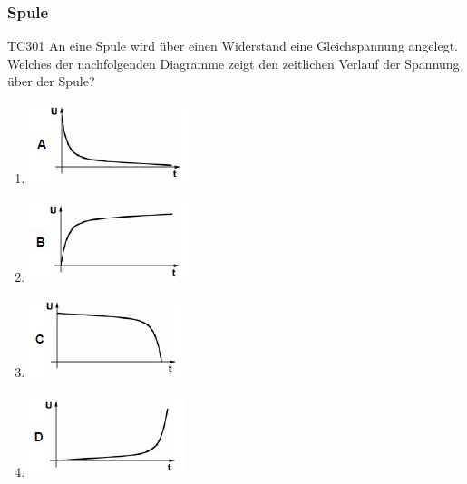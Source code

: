 \documentclass[8pt]{article}
\begin{document}
\begin{enumerate}
\begin{enumerate}[nolistsep,label=\Alph*]
{\subsubsection{Spule}
TC301 An eine Spule wird über einen Widerstand eine Gleichspannung angelegt. Welches der nachfolgenden Diagramme zeigt den zeitlichen Verlauf der Spannung über der Spule?
\begin{enumerate}[nolistsep,label=\Alph*]
\item 
	\begin{center}
		\begin{minipage}{\linewidth}
			\centering
			\includegraphics[scale=1.0]{pics/tc301_a.jpg}
		\end{minipage}
	\end{center}
\item
	\begin{center}
		\begin{minipage}{\linewidth}
			\centering
			\includegraphics[scale=1.0]{pics/tc301_b.jpg}
		\end{minipage}
	\end{center}
\item
	\begin{center}
		\begin{minipage}{\linewidth}
			\centering
			\includegraphics[scale=1.0]{pics/tc301_c.jpg}
		\end{minipage}
	\end{center}
\item
	\begin{center}
		\begin{minipage}{\linewidth}
			\centering
			\includegraphics[scale=1.0]{pics/tc301_d.jpg}
		\end{minipage}
	\end{center}
\end{enumerate}

}
\end{enumerate}
\end{enumerate}
\end{document}
